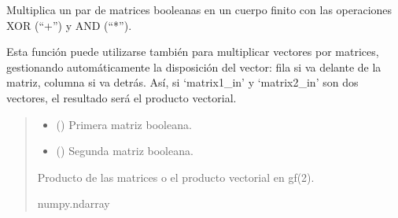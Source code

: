\documentclass[letterpaper,10pt,english]{sphinxmanual}
\begin{document}
\begin{fulllineitems}
\label{\detokenize{utils.bool:utils.bool.matrix_multiply_gf2}}
\pysigstartsignatures
{}
\pysigstopsignatures
\sphinxAtStartPar
Multiplica un par de matrices booleanas en un cuerpo finito con las operaciones XOR (“+”) y AND (“*”).

\sphinxAtStartPar
Esta función puede utilizarse también para multiplicar vectores por matrices, gestionando automáticamente
la disposición del vector: fila si va delante de la matriz, columna si va detrás. Así, si ‘matrix1\_in’ y
‘matrix2\_in’ son dos vectores, el resultado será el producto vectorial.
\begin{quote}\begin{description}
\begin{itemize}
\item {} 
\sphinxAtStartPar
{} () \textendash{} Primera matriz booleana.

\item {} 
\sphinxAtStartPar
{} () \textendash{} Segunda matriz booleana.

\end{itemize}

\sphinxAtStartPar
Producto de las matrices o el producto vectorial en gf(2).

\sphinxAtStartPar
numpy.ndarray

\end{description}\end{quote}

\end{fulllineitems}


\sphinxstepscope
\end{document}
